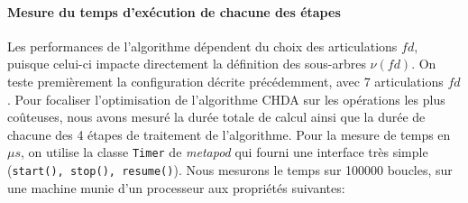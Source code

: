 \documentclass{report}
\begin{document}
\paragraph{Mesure du temps d'exécution de chacune des étapes}
Les performances de l'algorithme dépendent du choix des articulations $fd$, puisque celui-ci impacte directement la définition des sous-arbres $\nu(fd)$. On teste premièrement la configuration décrite précédemment, avec 7 articulations $fd$. Pour focaliser l'optimisation de l'algorithme CHDA sur les opérations les plus coûteuses, nous avons mesuré la durée totale de calcul ainsi que la durée de chacune des 4 étapes de traitement de l'algorithme. Pour la mesure de temps en $\mu s$, on utilise la classe \verb;Timer; de \emph{metapod} qui fourni une interface très simple (\verb;start(), stop(), resume();). Nous mesurons le temps sur 100000 boucles, sur une machine munie d'un processeur aux propriétés suivantes:\\
\end{document}

